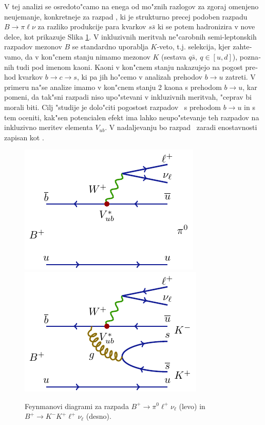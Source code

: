 \begin{otherlanguage}{slovene}
V tej analizi se osredoto"camo na enega od mo"znih razlogov za zgoraj omenjeno neujemanje, konkretneje za razpad \decayb, ki je strukturno precej podoben razpadu $B \to \pi \ell \nu$ za razliko produkcije para kvarkov $s \bar s$ ki se potem hadronizira v nove delce, kot prikazuje Slika \ref{feynman}. V inkluzivnih meritvah ne"carobnih semi-leptonskih razpadov mezonov $B$ se standardno uporablja $K$-veto, t.j. selekcija, kjer zahtevamo, da v kon"cnem stanju nimamo mezonov $K$ (sestava $q \bar s,~q \in [u,d]$), poznanih tudi pod imenom kaoni. Kaoni v kon"cnem stanju nakazujejo na pogost prehod kvarkov $b \to c \to s$, ki pa jih ho"cemo v analizah prehodov $b \to u$ zatreti. V primeru na"se analize imamo v kon"cnem stanju 2 kaona s prehodom $b \to u$, kar pomeni, da tak"sni razpadi niso upo"stevani v inkluzivnih meritvah, "ceprav bi morali biti. Cilj "studije je dolo"citi pogostost razpadov \decayb~s prehodom $b\to u$ in s tem oceniti, kak"sen potencialen efekt ima lahko neupo"stevanje teh razpadov na inkluzivno meritev elementa $V_{ub}$. V nadaljevanju bo razpad \decayb~zaradi enostavnosti zapisan kot \decaya.
\begin{figure}[!htb]
\centering
\includegraphics{texfig/B2pilnu}
\hspace{1cm}
\includegraphics{texfig/B2KKlnu}
\caption{Feynmanovi diagrami za razpada $B^+ \to \pi^0 \ell^+ \nu_\ell$ (levo) in $B^+ \to K^- K^+ \ell^+ \nu_\ell$ (desno).}
\label{feynman}
\end{figure}


\end{otherlanguage}
